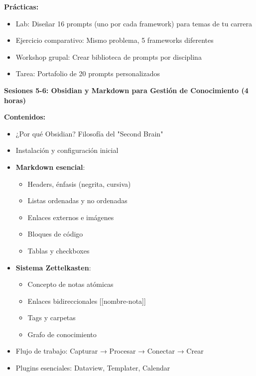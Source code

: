 \documentclass[12pt,a4paper]{yaac-luatex}
\newcommand{\subsecciontitulo}[1]{
	{\color{maincolor}\large\bfseries #1}
}
\begin{document}
\begin{tcolorbox}[
		enhanced,
		colback=white,
		colframe=curso1color,
		arc=3pt,
		boxrule=1.5pt,
		left=10pt,
		right=10pt,
		top=8pt,
		bottom=8pt,
		breakable
		]
	\textbf{Prácticas:}
	\begin{itemize}[leftmargin=*, itemsep=0.1cm]
		\item Lab: Diseñar 16 prompts (uno por cada framework) para temas de tu carrera
		\item Ejercicio comparativo: Mismo problema, 5 frameworks diferentes
		\item Workshop grupal: Crear biblioteca de prompts por disciplina
		\item Tarea: Portafolio de 20 prompts personalizados
	\end{itemize}
	\end{tcolorbox}
	
	\vspace{0.3cm}
	
	\begin{tcolorbox}[
		enhanced,
		colback=white,
		colframe=curso1color,
		arc=3pt,
		boxrule=1.5pt,
		left=10pt,
		right=10pt,
		top=8pt,
		bottom=8pt,
		breakable
		]
		\subsecciontitulo{Sesiones 5-6: Obsidian y Markdown para Gestión de Conocimiento (4 horas)}
		
		\textbf{Contenidos:}
		\begin{itemize}[leftmargin=*, itemsep=0.1cm]
			\item ¿Por qué Obsidian? Filosofía del "Second Brain"
			\item Instalación y configuración inicial
			\item \textbf{Markdown esencial}:
			\begin{itemize}
				\item Headers, énfasis (negrita, cursiva)
				\item Listas ordenadas y no ordenadas
				\item Enlaces externos e imágenes
				\item Bloques de código
				\item Tablas y checkboxes
			\end{itemize}
			\item \textbf{Sistema Zettelkasten}:
			\begin{itemize}
				\item Concepto de notas atómicas
				\item Enlaces bidireccionales [[nombre-nota]]
				\item Tags y carpetas
				\item Grafo de conocimiento
			\end{itemize}
			\item Flujo de trabajo: Capturar → Procesar → Conectar → Crear
			\item Plugins esenciales: Dataview, Templater, Calendar
		\end{itemize}
		

\end{tcolorbox}
\end{document}
